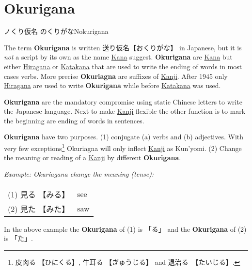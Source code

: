 \section{Okurigana}
\label{sec:Okurigana}
\label{sec:Nokurigana}
 {ノくり仮名} {のくりがな}{Nokurigana}

The term \textbf{Okurigana} is written {送り仮名}{【おくりがな】} in Japanese,
but it is \textit{not} a script by its own as the name
\hyperref[sec:Kana]{Kana} suggest.  \textbf{Okurigana} are
\hyperref[sec:Kana]{Kana} but either \hyperref[sec:Hiragana]{Hiragana} or
\hyperref[sec:Katakana]{Katakana} that are used to write the ending of words in
most cases verbs. More precise \textbf{Okuriagna} are suffixes of
\hyperref[sec:Kanji]{Kanji}. After 1945 only
\hyperref[sec:Hiragagana]{Hiragana} are used to write \textbf{Okurigana} while
before \hyperref[sec:Katakana]{Katakana} was used. 

\textbf{Okurigana} are the mandatory compromise using static Chinese letters to
write the Japanese language. Next to make \hyperref[sec:Kanji]{Kanji} flexible
the other function is to mark the beginning are ending of words in sentences. 

\textbf{Okurigana} have two purposes. (1) conjugate (a) verbs and (b)
adjectives. With very few exceptions\footnote{ {皮肉る} {【ひにくる】},
{牛耳る}  {【ぎゅうじる】} and {退治る}　{【たいじる】}.}  Okuriagna will only
inflect \hyperref[sec:Kanji]{Kanji} as Kun'yomi.  (2) Change the meaning or
reading of a \hyperref[sec:Kanji]{Kanji} by different \textbf{Okurigana}.

\textit{Example: Okuriagana change the meaning (tense):}

\begin{center}\begin{tabular}{ll}
(1) {見る} {【みる】} & see \\
(2) {見た} {【みた】} & saw \\
\end{tabular}\end{center}

In the above example the \textbf{Okurigana} of (1) is {「る」} and the
\textbf{Okurigana} of (2) is {「た」}.

